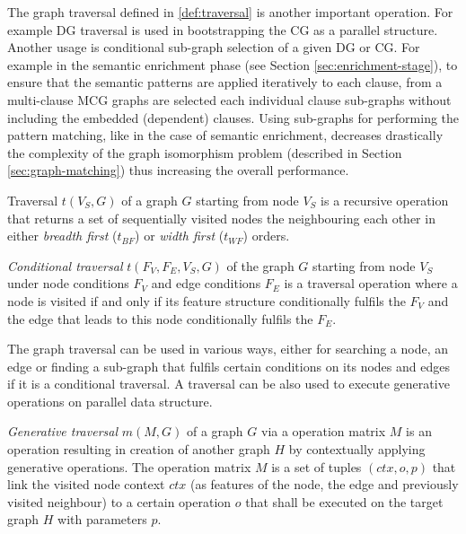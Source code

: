 The graph traversal defined in \ref{def:traversal} is another important operation. For example DG traversal is used in bootstrapping the CG as a parallel structure. Another usage is conditional sub-graph selection of a given DG or CG. For example in the semantic enrichment phase (see Section \ref{sec:enrichment-stage}), to ensure that the semantic patterns are applied iteratively to each clause, from a multi-clause MCG graphs are selected each individual clause sub-graphs without including the embedded (dependent) clauses. Using sub-graphs for performing the pattern matching, like in the case of semantic enrichment, decreases drastically the complexity of the graph isomorphism problem (described in Section \ref{sec:graph-matching}) thus increasing the overall performance. 

\begin{definition}[Traversal]\label{def:traversal}
	Traversal $t(V_S,G)$ of a graph $G$ starting from node $V_S$ is a recursive operation that returns a set of sequentially visited nodes the neighbouring each other in either \textit{breadth first} ($t_{BF}$) or \textit{width first} ($t_{WF}$) orders.
\end{definition}

\begin{definition}\label{def:conditional-traversal}
	\textit{Conditional traversal} $t(F_V,F_E,V_S,G)$ of the graph $G$ starting from node $V_S$ under node conditions $F_V$ and edge conditions $F_E$ is a traversal operation where a node is visited if and only if its feature structure conditionally fulfils the $F_V$ and the edge that leads to this node conditionally fulfils the $F_E$.
\end{definition}

The graph traversal can be used in various ways, either for searching a node, an edge or finding a sub-graph that fulfils certain conditions on its nodes and edges if it is a conditional traversal. A traversal can be also used to execute generative operations on parallel data structure. 

\begin{definition}\label{def:generative-traversal}
	\textit{Generative traversal} $m(M,G)$ of a graph $G$ via a operation matrix $M$ is an operation resulting in creation of another graph $H$ by contextually applying generative operations. The operation matrix $M$ is a set of tuples $(ctx,o,p)$ that link the visited node context $ctx$ (as features of the node, the edge and previously visited neighbour) to a certain operation $o$ that shall be executed on the target graph $H$ with parameters $p$.
\end{definition}

